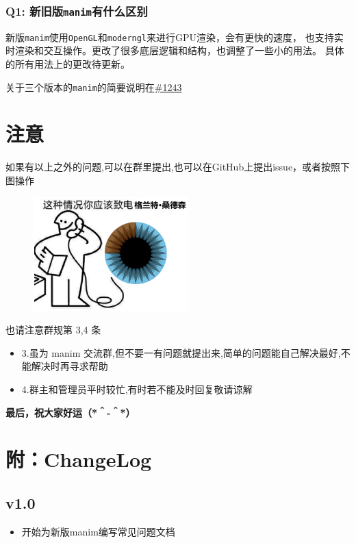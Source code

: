 \documentclass[cn,blue,14pt,normal]{elegantnote}
\begin{document}
\subsubsection*{Q1: 新旧版\texttt{manim}有什么区别}

新版\texttt{manim}使用\texttt{OpenGL}和\texttt{moderngl}来进行GPU渲染，会有更快的速度，
也支持实时渲染和交互操作。更改了很多底层逻辑和结构，也调整了一些小的用法。
具体的所有用法上的更改待更新。

关于三个版本的\texttt{manim}的简要说明在\href{https://github.com/3b1b/manim/issues/1243}{\#1243}

\newpage

\section{注意}

如果有以上之外的问题,可以在群里提出,也可以在GitHub上提出issue，或者按照下图操作

    \begin{figure}[h]
        \begin{center}
            \includegraphics[width=6cm]{assets/grant.png}
        \end{center}
    \end{figure}

也请注意群规第 3,4 条
\begin{itemize}
    \item 3.虽为 manim 交流群,但不要一有问题就提出来,简单的问题能自己解决最好,不能解决时再寻求帮助
    \item 4.群主和管理员平时较忙,有时若不能及时回复敬请谅解
\end{itemize}

\begin{center}
\textbf{最后，祝大家好运（*＾-＾*）}
\end{center}

\newpage

\section{附：ChangeLog}

\subsection*{v1.0}
\begin{itemize}
	\item 开始为新版manim编写常见问题文档
\end{itemize}
\end{document}
